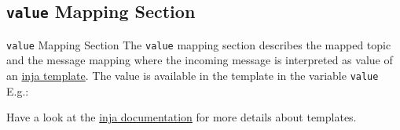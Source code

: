 ﻿\subsection{\texttt{value} Mapping Section}

\begin{frame}[fragile]{\texttt{value} Mapping Section}
  The \textcolor{fh-ooe-red}{\texttt{value}} mapping section describes the \textcolor{fh-ooe-red}{mapped topic} and the \textcolor{fh-ooe-red}{message mapping} where the \textcolor{fh-ooe-red}{incoming message} is \textcolor{fh-ooe-red}{interpreted as value} of an \textcolor{fh-ooe-red}{\href{https://github.com/pantor/inja/tree/master}{inja template}}. The \textcolor{fh-ooe-red}{value} is available in the template in the variable \texttt{\textcolor{fh-ooe-red}{value}}\\E.g.:

  Have a look at the \textcolor{fh-ooe-red}{\href{https://github.com/pantor/inja/tree/master}{inja documentation}} for more details about templates.
\end{frame}

